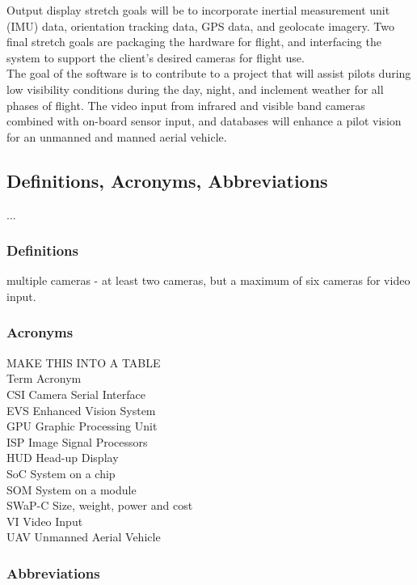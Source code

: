 \documentclass[letterpaper,10pt,serif,draftclsnofoot,onecolumn,compsoc,titlepage]{IEEEtran}
\begin{document}
Output display stretch goals will be to incorporate inertial measurement unit (IMU) 
data, orientation tracking data, GPS data, and geolocate imagery. Two final stretch 
goals are packaging the hardware for flight, and interfacing the system to support
the client's desired cameras for flight use.\\

The goal of the software is to contribute to a project that will assist pilots during 
low visibility conditions during the day, night, and inclement weather for all phases 
of flight. The video input from infrared and visible band cameras combined with 
on-board sensor input, and databases will enhance a pilot vision for an unmanned and 
manned aerial vehicle.\\

\subsection{Definitions, Acronyms, Abbreviations}

...

\subsubsection{Definitions}

multiple cameras - at least two cameras, but a maximum of six cameras for video input.

\subsubsection{Acronyms}

MAKE THIS INTO A TABLE\\
Term
Acronym\\
CSI
Camera Serial Interface\\
EVS
Enhanced Vision System\\
GPU
Graphic Processing Unit\\
ISP
Image Signal Processors\\
HUD
Head-up Display\\
SoC
System on a chip\\
SOM
System on a module\\
SWaP-C
Size, weight, power and cost\\
VI
Video Input\\
UAV
Unmanned Aerial Vehicle\\

\subsubsection{Abbreviations}
\end{document}
